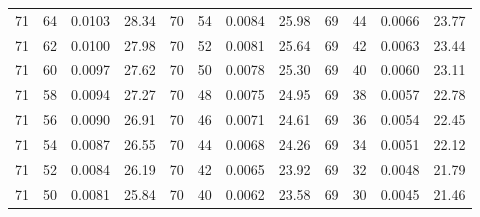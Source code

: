 \begin{tabular}{llll|llll|llll}
71 & 64 & 0.0103 & 28.34 & 70 & 54 & 0.0084 & 25.98 & 69 & 44 & 0.0066 & 23.77\\
71 & 62 & 0.0100 & 27.98 & 70 & 52 & 0.0081 & 25.64 & 69 & 42 & 0.0063 & 23.44\\
71 & 60 & 0.0097 & 27.62 & 70 & 50 & 0.0078 & 25.30 & 69 & 40 & 0.0060 & 23.11\\
71 & 58 & 0.0094 & 27.27 & 70 & 48 & 0.0075 & 24.95 & 69 & 38 & 0.0057 & 22.78\\
71 & 56 & 0.0090 & 26.91 & 70 & 46 & 0.0071 & 24.61 & 69 & 36 & 0.0054 & 22.45\\
71 & 54 & 0.0087 & 26.55 & 70 & 44 & 0.0068 & 24.26 & 69 & 34 & 0.0051 & 22.12\\
71 & 52 & 0.0084 & 26.19 & 70 & 42 & 0.0065 & 23.92 & 69 & 32 & 0.0048 & 21.79\\
71 & 50 & 0.0081 & 25.84 & 70 & 40 & 0.0062 & 23.58 & 69 & 30 & 0.0045 & 21.46\\
\bottomrule
\end{tabular}
\newpage
